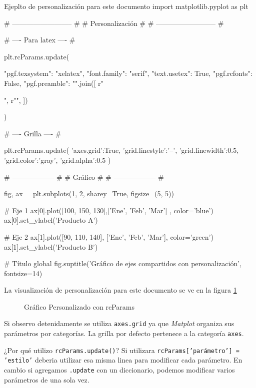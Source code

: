 \begin{pycode}{Ejeplto de personalización para este documento}
import matplotlib.pyplot as plt

# -------------------------- #
#       Personalización      #
# -------------------------- #

# ---- Para latex ---- #

plt.rcParams.update({
    "pgf.texsystem": "xelatex",    
    "font.family": "serif",
    "text.usetex": True,           
    "pgf.rcfonts": False,          
    "pgf.preamble": "\n".join([    
         r"\usepackage{fontspec}",
         r"\setmainfont{CMU Serif}",
    ])
})

# ---- Grilla ---- #

plt.rcParams.update({
    'axes.grid':True,
    'grid.linestyle':'--',
    'grid.linewidth':0.5,
    'grid.color':'gray',
    'grid.alpha':0.5
})

# ------------------ #
#       Gráfico      #
# ------------------ #

fig, ax = plt.subplots(1, 2, sharey=True, figsize=(5, 5))

# Eje 1
ax[0].plot([100, 150, 130],['Ene', 'Feb', 'Mar'] , color='blue')
ax[0].set_ylabel('Producto A')

# Eje 2
ax[1].plot([90, 110, 140], ['Ene', 'Feb', 'Mar'], color='green')
ax[1].set_ylabel('Producto B')

# Título global
fig.suptitle('Gráfico de ejes compartidos con personalización', fontsize=14)    
\end{pycode}

La visualización de personalización para este documento se ve en la figura \ref{fig:grafico_objeto_con_rcParams}
\begin{figure}[ht]
    \centering
     
    \caption{Gráfico Personalizado con rcParams}
    \label{fig:grafico_objeto_con_rcParams}
\end{figure}

\begin{nota}
    Si observo detenidamente se utiliza \texttt{axes.grid} ya que \textit{Matplot} organiza sus parámetros por categorías. La grilla por defecto pertenece a la categoría \texttt{axes}.

    ¿Por qué utilizo \texttt{rcParams.update()}? Si utilizara \texttt{rcParams['parámetro'] = 'estilo'} deberia utilizar esa misma linea para modificar cada parámetro. En cambio si agregamos \texttt{.update} con un diccionario, podemos modificar varios parámetros de una sola vez.
\end{nota}

